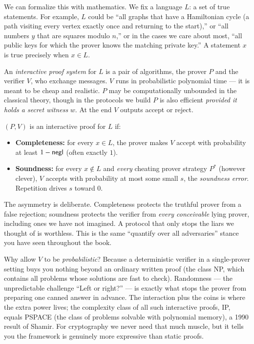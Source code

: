 We can formalize this with mathematics. We fix a language $L$: a set of true
statements. For example, $L$ could be ``all graphs that have a Hamiltonian
cycle (a path visiting every vertex exactly once and returning to the start),'' or ``all numbers $y$ that are squares modulo $n$,'' or in the cases we
care about most, ``all public keys for which the prover knows the matching
private key.'' A statement $x$ is true precisely when $x \in L$.

An \emph{interactive proof system} for $L$ is a pair of algorithms, the prover
$P$ and the verifier $V$, who exchange messages. $V$ runs in probabilistic
polynomial time --- it is meant to be cheap and realistic. $P$ may be
computationally unbounded in the classical theory, though in the protocols we
build $P$ is also efficient \emph{provided it holds a secret witness} $w$. At
the end $V$ outputs accept or reject.

\begin{definition}
\label{ch31:def-ip}
$(P,V)$ is an interactive proof for $L$ if:
\begin{itemize}
  \item \textbf{Completeness:} for every $x \in L$, the prover makes $V$ accept
  with probability at least $1 - \mathsf{negl}$ (often exactly $1$).
  \item \textbf{Soundness:} for every $x \notin L$ and \emph{every} cheating
  prover strategy $P^*$ (however clever), $V$ accepts with probability at most
  some small $s$, the \emph{soundness error}. Repetition drives $s$ toward $0$.
\end{itemize}
\end{definition}

The asymmetry is deliberate. Completeness protects the truthful prover from a
false rejection; soundness protects the verifier from \emph{every conceivable}
lying prover, including ones we have not imagined. A protocol that only stops
the liars we thought of is worthless. This is the same ``quantify over all
adversaries'' stance you have seen throughout the book.

\begin{walkbox}
Why allow $V$ to be \emph{probabilistic}? Because a deterministic verifier in a
single-prover setting buys you nothing beyond an ordinary written proof (the
class \textsf{NP}, which contains all problems whose solutions are fast to check). Randomness --- the unpredictable challenge ``Left or
right?'' --- is exactly what stops the prover from preparing one canned answer in
advance. The interaction plus the coins is where the extra power lives; the
complexity class of all such interactive proofs, \textsf{IP}, equals
\textsf{PSPACE} (the class of problems solvable with polynomial memory), a 1990 result of Shamir. For cryptography we never
need that much muscle, but it tells you the framework is genuinely more
expressive than static proofs.
\end{walkbox}

